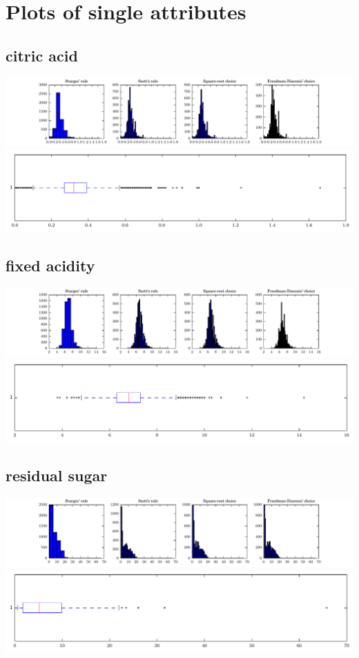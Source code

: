\documentclass{report}
\begin{document}
\section{Plots of single attributes}
\centering
\subsection{citric acid}
\includegraphics{histograms/citric_acid.pdf}
\includegraphics{boxplots/citric_acid.pdf}
\subsection{fixed acidity}
\includegraphics{histograms/fixed_acidity.pdf}
\includegraphics{boxplots/fixed_acidity.pdf}
\subsection{residual sugar}
\includegraphics{histograms/residual_sugar.pdf}
\includegraphics{boxplots/residual_sugar.pdf}
\end{document}
